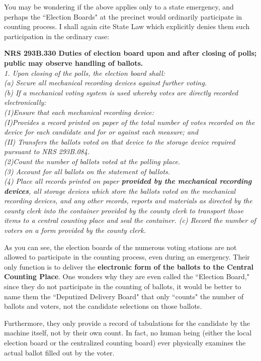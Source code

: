 You may be wondering if the above applies only to a state emergency, and perhaps the ``Election Boards" at the precinct would ordinarily participate in counting process. I shall again cite State Law which explicitly denies them such participation in the ordinary case:

\textbf{ NRS 293B.330 Duties of election board upon and after closing of polls; public may observe handling of ballots.}\\
\textit{1. Upon closing of the polls, the election board shall:\\
(a) Secure all mechanical recording devices against further voting.\\
(b) If a mechanical voting system is used whereby votes are directly recorded electronically:\\
(1)Ensure that each mechanical recording device:\\
(I)Provides a record printed on paper of the total number of votes recorded on the device for each candidate and for or against each measure; and\\
(II) Transfers the ballots voted on that device to the storage device required pursuant to NRS 293B.084.\\
(2)Count the number of ballots voted at the polling place.\\
(3) Account for all ballots on the statement of ballots.\\
(4) Place all records printed on paper \textbf{provided by the mechanical recording devices}, all storage devices which store the ballots voted on the mechanical recording devices, and any other records, reports and materials as directed by the county clerk into the container provided by the county clerk to transport those items to a central counting place and seal the container.
 (c) Record the number of voters on a form provided by the county clerk.}

As you can see, the election boards of the numerous voting stations are not allowed to participate in the counting process, even during an emergency. Their only function is to deliver the \textbf{electronic form of the ballots to the Central Counting Place}. One wonders why they are even called the ``Election Board," since they do not participate in the counting of ballots, it would be better to name them the ``Deputized Delivery Board" that only ``counts" the number of ballots and voters, not the candidate selections on those ballots.

Furthermore, they only provide a record of tabulations for the candidate by the machine itself, not by their own count. In fact, no human being (either the local election board or the centralized counting board) ever physically examines the actual ballot filled out by the voter.

